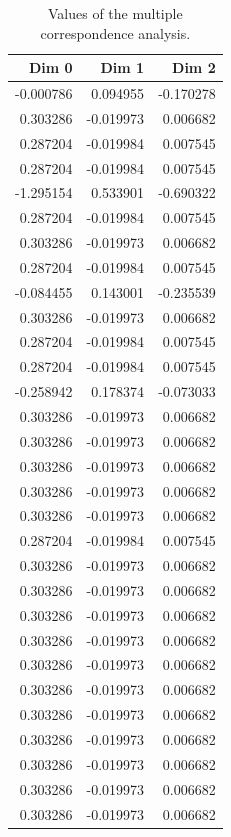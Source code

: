 \documentclass[a4paper,twoside,12pt]{book}
\begin{document}
\begin{appendices}
\begin{table}
\centering
\caption{Values of the multiple correspondence analysis.}
\label{id:tab:MCAValues}
\begin{tabular}{rrr}
	\toprule
		Dim 0 &     Dim 1 &     Dim 2 \\
	\midrule
	-0.000786 &  0.094955 & -0.170278 \\
	 0.303286 & -0.019973 &  0.006682 \\
	 0.287204 & -0.019984 &  0.007545 \\
	 0.287204 & -0.019984 &  0.007545 \\
	-1.295154 &  0.533901 & -0.690322 \\
	 0.287204 & -0.019984 &  0.007545 \\
	 0.303286 & -0.019973 &  0.006682 \\
	 0.287204 & -0.019984 &  0.007545 \\
	-0.084455 &  0.143001 & -0.235539 \\
	 0.303286 & -0.019973 &  0.006682 \\
	 0.287204 & -0.019984 &  0.007545 \\
	 0.287204 & -0.019984 &  0.007545 \\
	-0.258942 &  0.178374 & -0.073033 \\
	 0.303286 & -0.019973 &  0.006682 \\
	 0.303286 & -0.019973 &  0.006682 \\
	 0.303286 & -0.019973 &  0.006682 \\
	 0.303286 & -0.019973 &  0.006682 \\
	 0.303286 & -0.019973 &  0.006682 \\
	 0.287204 & -0.019984 &  0.007545 \\
	 0.303286 & -0.019973 &  0.006682 \\
	 0.303286 & -0.019973 &  0.006682 \\
	 0.303286 & -0.019973 &  0.006682 \\
	 0.303286 & -0.019973 &  0.006682 \\
	 0.303286 & -0.019973 &  0.006682 \\
	 0.303286 & -0.019973 &  0.006682 \\
	 0.303286 & -0.019973 &  0.006682 \\
	 0.303286 & -0.019973 &  0.006682 \\
	 0.303286 & -0.019973 &  0.006682 \\
	 0.303286 & -0.019973 &  0.006682 \\
	 0.303286 & -0.019973 &  0.006682 \\

\end{tabular}
\end{table}
\end{appendices}
\end{document}

